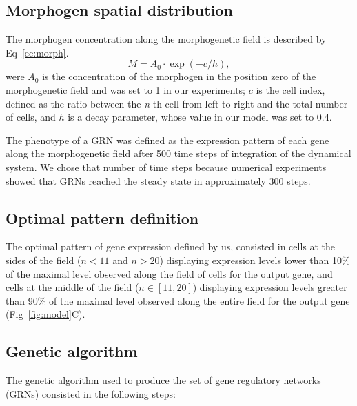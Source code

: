 \documentclass[10pt,letterpaper]{article}
\begin{document}
\subsection*{Morphogen spatial distribution}

The morphogen concentration along the morphogenetic field is described by
Eq~\ref{ec:morph}.
\begin{equation}
 M = A_0 \cdot \exp(-c/h),
 \label{ec:morph}
\end{equation}
\noindent
were $A_0$ is the concentration of the morphogen in the position zero of the
morphogenetic field and was set to 1 in our experiments; $c$ is the cell index,
defined as the ratio between the \emph{n}-th cell from left to right and the
total number of cells, and $h$ is a decay parameter, whose value in our model
was set to 0.4.

The phenotype of a GRN was defined as the expression pattern of each gene along
the morphogenetic field after 500 time steps of integration of the dynamical
system. We chose that number of time steps because numerical experiments showed
that GRNs reached the steady state in approximately 300 steps.

\subsection*{Optimal pattern definition}

The optimal pattern of gene expression defined by us, consisted in cells at the
sides of the field ($n<11$ and $n>20$) displaying expression levels lower than
10\% of the maximal level observed along the field of cells for the output gene,
and cells at the middle of the field ($n ∈ [11,20]$) displaying expression
levels greater than 90\% of the maximal level observed along the entire field
for the output gene (Fig~\ref{fig:model}C).

\subsection*{Genetic algorithm}

The genetic algorithm used to produce the set of gene regulatory networks (GRNs)
consisted in the following steps:
\end{document}
